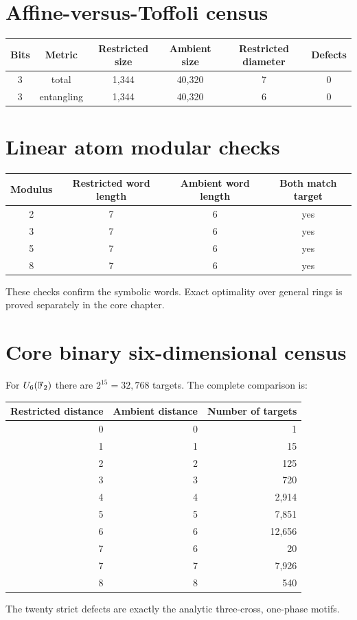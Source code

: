 \section{Affine-versus-Toffoli census}
\begin{longtable}{@{}cccccc@{}}
\toprule
Bits & Metric & Restricted size & Ambient size & Restricted diameter & Defects\\
\midrule
3 & total & 1,344 & 40,320 & 7 & 0\\
3 & entangling & 1,344 & 40,320 & 6 & 0\\
\bottomrule
\end{longtable}

\section{Linear atom modular checks}
\begin{longtable}{@{}cccc@{}}
\toprule
Modulus & Restricted word length & Ambient word length & Both match target\\
\midrule
2 & 7 & 6 & yes\\
3 & 7 & 6 & yes\\
5 & 7 & 6 & yes\\
8 & 7 & 6 & yes\\
\bottomrule
\end{longtable}
These checks confirm the symbolic words.  Exact optimality over general rings is proved separately in the core chapter.

\section{Core binary six-dimensional census}
For $U_6(\mathbb F_2)$ there are $2^{15}=32{,}768$ targets.  The complete comparison is:
\begin{longtable}{@{}rrr@{}}
\toprule
Restricted distance & Ambient distance & Number of targets\\
\midrule
0 & 0 & 1\\
1 & 1 & 15\\
2 & 2 & 125\\
3 & 3 & 720\\
4 & 4 & 2,914\\
5 & 5 & 7,851\\
6 & 6 & 12,656\\
7 & 6 & 20\\
7 & 7 & 7,926\\
8 & 8 & 540\\
\bottomrule
\end{longtable}
The twenty strict defects are exactly the analytic three-cross, one-phase motifs.

